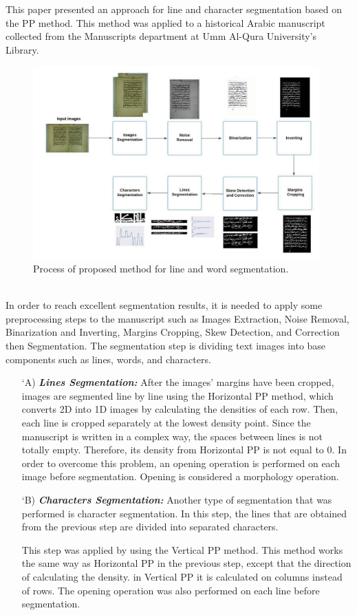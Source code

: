This paper \cite{PP} presented an approach for line and character segmentation based on the PP method. This method was applied to a historical Arabic manuscript collected from the Manuscripts department at Umm Al-Qura University’s Library.
 \begin{figure}[!htb]
    \centering
    \includegraphics[width=11cm]{images/pp_seg.png}
    \caption{Process of proposed method for line and word segmentation.}
    \label{fig:pp_seg}
\end{figure}
\newline\\
In order to reach excellent segmentation results, it is needed to apply some preprocessing steps to the manuscript such as Images Extraction, Noise Removal, Binarization and Inverting, Margins Cropping, Skew Detection, and Correction then Segmentation. The segmentation step is dividing text images into base components such as lines, words, and characters.
\begin{itemize}[labelindent=1em,labelsep=0.25cm,leftmargin=*]

        \item[\char `A)] \textit{\textbf{Lines Segmentation:}} 
         After the images’ margins have been cropped, images are segmented line by line using the Horizontal PP method, which converts 2D into 1D images by calculating the densities of each row. Then, each line is cropped separately at the lowest density point. Since the manuscript is written in a complex way, the spaces between lines is not totally empty. Therefore, its density from Horizontal PP is not equal to 0. In order to overcome this problem, an opening operation is performed on each image before segmentation. Opening is considered a morphology operation.
        
        \item[\char `B)] \textit{\textbf{Characters Segmentation:}} 
        Another type of segmentation that was performed is character segmentation. In this step, the lines that are obtained from the previous step are divided into separated characters.
        
        This step was applied by using the Vertical PP method. This method works the same way as Horizontal PP in the previous step, except that the direction of calculating the density. in Vertical PP it is calculated on columns instead of rows. The opening operation was also performed on each line before segmentation.
    \end{itemize}

